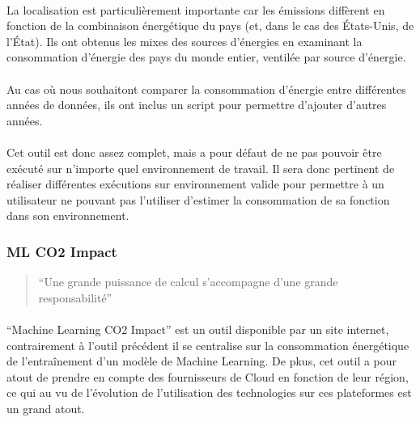 \documentclass[10pt, french, a4paper]{report}
\begin{document}
\paragraph{}
La localisation est particulièrement importante car les émissions diffèrent en fonction de la combinaison énergétique du pays (et, dans le cas des États-Unis, de l'État). Ils ont obtenus les mixes des sources d'énergies en examinant la consommation d'énergie des pays du monde entier, ventilée par source d'énergie.

\paragraph{}
Au cas où nous souhaitont comparer la consommation d'énergie entre différentes années de données, ils ont inclus un script pour permettre d'ajouter d'autres années.

\paragraph{}
Cet outil est donc assez complet, mais a pour défaut de ne pas pouvoir être exécuté sur n'importe quel environnement de travail. Il sera donc pertinent de réaliser différentes exécutions sur environnement valide pour permettre à un utilisateur ne pouvant pas l'utiliser d'estimer la consommation de sa fonction dans son environnement.

\subsubsection{ML CO2 Impact}

\begin{quotation}
  ``Une grande puissance de calcul s'accompagne d'une grande responsabilité''
\end{quotation}

\paragraph{}
``Machine Learning CO2 Impact'' est un outil disponible par un site internet, contrairement à l'outil précédent il se centralise sur la consommation énergétique de l'entraînement d'un modèle de Machine Learning. De pkus, cet outil a pour atout de prendre en compte des fournisseurs de Cloud en fonction de leur région, ce qui au vu de l'évolution de l'utilisation des technologies sur ces plateformes est un grand atout.
\end{document}
